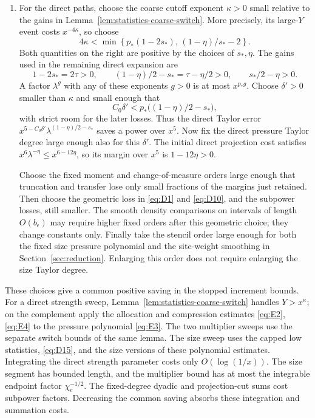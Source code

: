 \begin{enumerate}
\item For the direct paths, choose the coarse cutoff exponent
\(\kappa>0\) small relative to the gains in
Lemma~\ref{lem:statistics-coarse-switch}.  More precisely, its
large-\(Y\) event costs \(x^{-4\kappa}\), so choose
\[
 4\kappa<\min\left\{p_*(1-2s_*),\,
                       (1-\eta)/s_*-2\right\}.
\]
Both quantities on the right are positive by the choices of
\(s_*,\eta\).  The gains used in the
remaining direct expansion are
\[
 1-2s_*=2\tau>0,\qquad
 (1-\eta)/2-s_*=\tau-\eta/2>0,\qquad
 s_*/2-\eta>0.
\]
A factor \(\lambda^g\) with any of these exponents \(g>0\) is at
most \(x^{p_*g}\).  Choose \(\delta'>0\) smaller than \(\kappa\)
and small enough that
\[
 C_0\delta'<p_*\bigl((1-\eta)/2-s_*\bigr),
\]
with strict room for the later losses.  Thus the direct Taylor error
\(x^{5-C_0\delta'}\lambda^{(1-\eta)/2-s_*}\) saves a power over
\(x^5\).  Now fix the direct pressure Taylor degree large enough
also for this \(\delta'\).  The initial direct projection cost
satisfies
\(x^6\lambda^{-\eta}\le x^{6-12\eta}\), so its margin over
\(x^5\) is \(1-12\eta>0\).

Choose the fixed moment and change-of-measure orders large enough
that truncation and transfer lose only small fractions of the margins
just retained.  Then choose the geometric loss in \eqref{eq:D1} and
\eqref{eq:D10}, and the subpower losses, still smaller.  The smooth
density comparisons on intervals of length \(O(b_\epsilon)\) may
require higher fixed orders after this geometric choice; they change
constants only.  Finally take the stencil order large enough for
both the fixed size pressure polynomial and the site-weight smoothing
in Section~\ref{sec:reduction}.  Enlarging this order does not require
enlarging the size Taylor degree.
\end{enumerate}

These choices give a common positive saving in the stopped increment
bounds.  For a direct strength sweep, Lemma~\ref{lem:statistics-coarse-switch}
handles \(Y>x^\kappa\); on the complement apply the allocation
and compression estimates \eqref{eq:E2}, \eqref{eq:E4} to the
pressure polynomial \eqref{eq:E3}. The two multiplier sweeps use the
separate switch bounds of the same lemma. The size sweep uses the
capped low statistics, \eqref{eq:D15}, and the size versions of these
polynomial estimates.  Integrating the direct strength
parameter costs only \(O(\log(1/x))\).  The size segment has bounded
length, and the multiplier bound has at most the integrable endpoint
factor \(\chi_e^{-1/2}\).  The fixed-degree dyadic and projection-cut
sums cost subpower factors.  Decreasing the common saving absorbs
these integration and summation costs.


